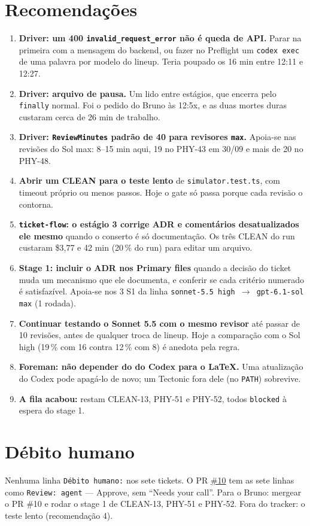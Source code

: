 \documentclass[11pt,a4paper]{article}
\begin{document}
\section{Recomendações}
\begin{enumerate}
  \item \textbf{Driver: um 400 \texttt{invalid\_request\_error} não é queda de
        API.} Parar na primeira com a mensagem do backend, ou fazer no
        Preflight um \texttt{codex exec} de uma palavra por modelo do lineup.
        Teria poupado os 16 min entre 12:11 e 12:27.
  \item \textbf{Driver: arquivo de pausa.} Um
         lido entre estágios, que encerra pelo
        \texttt{finally} normal. Foi o pedido do Bruno às 12:5x, e as duas
        mortes duras custaram cerca de 26 min de trabalho.
  \item \textbf{Driver: \texttt{ReviewMinutes} padrão de 40 para revisores
        \texttt{max}.} Apoia-se nas revisões do Sol max: 8--15 min aqui, 19 no
        PHY-43 em 30/09 e mais de 20 no PHY-48.
  \item \textbf{Abrir um CLEAN para o teste lento} de
        \texttt{simulator.test.ts}, com timeout próprio ou menos passos. Hoje o
        gate só passa porque cada revisão o contorna.
  \item \textbf{\texttt{ticket-flow}: o estágio 3 corrige ADR e comentários
        desatualizados ele mesmo} quando o conserto é só documentação. Os três
        CLEAN do run custaram \$3,77 e 42 min (20\,\% do run) para editar um
        arquivo.
  \item \textbf{Stage 1: incluir o ADR nos Primary files} quando a decisão do
        ticket muda um mecanismo que ele documenta, e conferir se cada
        critério numerado é satisfazível. Apoia-se nos 3 S1 da linha
        \texttt{sonnet-5.5 high $\to$ gpt-6.1-sol max} (1 rodada).
  \item \textbf{Continuar testando o Sonnet 5.5 com o mesmo revisor} até
        passar de 10 revisões, antes de qualquer troca de lineup. Hoje a
        comparação com o Sol high (19\,\% com 16 contra 12\,\% com 8) é
        anedota pela regra.
  \item \textbf{Foreman: não depender do  do Codex para o LaTeX.}
        Uma atualização do Codex pode apagá-lo de novo; um Tectonic fora dele
        (no \texttt{PATH}) sobrevive.
  \item \textbf{A fila acabou:} restam CLEAN-13, PHY-51 e PHY-52, todos
        \texttt{blocked} à espera do stage 1.
\end{enumerate}

\section{Débito humano}

Nenhuma linha \texttt{Débito humano:} nos sete tickets. O PR
\href{https://github.com/Laginho/PhysiSyst/pull/10}{\#10} tem as sete linhas
como \texttt{Review: agent} --- Approve, sem ``Needs your call''. Para o Bruno:
mergear o PR \#10 e rodar o stage 1 de CLEAN-13, PHY-51 e PHY-52. Fora do
tracker: o teste lento (recomendação 4).
\end{document}
